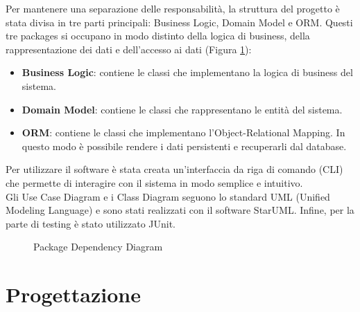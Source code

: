 \documentclass{article}
\begin{document}
\noindent Per mantenere una separazione delle responsabilità, la struttura del progetto è stata divisa in tre parti principali: Business Logic, Domain Model e ORM. Questi tre packages si occupano in modo distinto della logica di business, della rappresentazione dei dati e dell’accesso ai dati (Figura \ref{fig:diagram_packagedependency}):
\begin{itemize}
    \item \textbf{Business Logic}: contiene le classi che implementano la logica di business del sistema.
    \item \textbf{Domain Model}: contiene le classi che rappresentano le entità del sistema.
    \item \textbf{ORM}: contiene le classi che implementano l’Object-Relational Mapping. In questo modo è possibile rendere i dati persistenti e recuperarli dal database.
\end{itemize}
Per utilizzare il software è stata creata un’interfaccia da riga di comando (CLI) che permette di interagire con il sistema in modo semplice e intuitivo.
\\

\noindent Gli Use Case Diagram e i Class Diagram seguono lo standard UML (Unified Modeling Language) e sono stati realizzati con il software StarUML. Infine, per la parte di testing è stato utilizzato JUnit.
\begin{figure}[H]
    \centering
    \caption{Package Dependency Diagram}
    \label{fig:diagram_packagedependency}
\end{figure}

\newpage\section{Progettazione}
\end{document}
